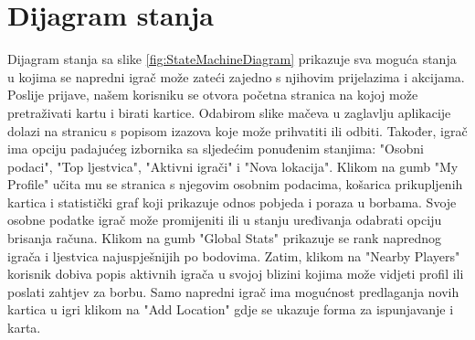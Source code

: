         	
			%
			
			\pagebreak
			
			
			
			
			\eject
		
		\section{Dijagram stanja}
			
			
			
            
            Dijagram stanja sa slike \ref{fig:StateMachineDiagram} prikazuje sva moguća stanja u kojima se napredni igrač može zateći zajedno s njihovim prijelazima i akcijama. Poslije prijave, našem korisniku se otvora početna stranica na kojoj može pretraživati kartu i birati kartice. Odabirom slike mačeva u zaglavlju aplikacije dolazi na stranicu s popisom izazova koje može prihvatiti ili odbiti. Također, igrač ima opciju padajućeg izbornika sa sljedećim ponuđenim stanjima: "Osobni podaci", "Top ljestvica", "Aktivni igrači" i "Nova lokacija". Klikom na gumb "My Profile" učita mu se stranica s njegovim osobnim podacima, košarica prikupljenih kartica i statistički graf koji prikazuje odnos pobjeda i poraza u borbama. Svoje osobne podatke igrač može promijeniti ili u stanju uređivanja odabrati opciju brisanja računa. Klikom na gumb "Global Stats" prikazuje se rank naprednog igrača i ljestvica najuspješnijih po bodovima. Zatim, klikom na "Nearby Players" korisnik dobiva popis aktivnih igrača u svojoj blizini kojima može vidjeti profil ili poslati zahtjev za borbu. Samo napredni igrač ima mogućnost predlaganja novih kartica u igri klikom na "Add Location" gdje se ukazuje forma za ispunjavanje i karta.
            
